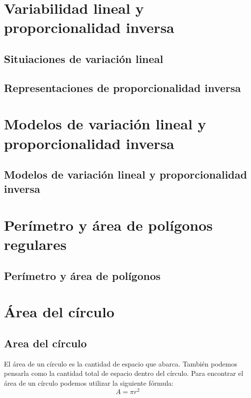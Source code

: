 \documentclass[11pt]{book}
\begin{document}
\section{Variabilidad lineal y proporcionalidad inversa}
\subsection{Situiaciones de variación lineal}
\subsection{Representaciones de proporcionalidad inversa}

\section{Modelos de variación lineal y proporcionalidad inversa}
\subsection{Modelos de variación lineal y proporcionalidad inversa}

\section{Per\'imetro y \'area de pol\'igonos regulares}
\subsection{Per\'imetro y \'area de pol\'igonos}

\section{\'Area del c\'irculo}


\subsection{Area del c\'irculo}
El área de un círculo es la cantidad de espacio que abarca. También podemos pensarla como la cantidad total de espacio dentro del círculo.
Para encontrar el área de un círculo podemos utilizar la siguiente fórmula:
\[A=\pi r^2\]
\end{document}
